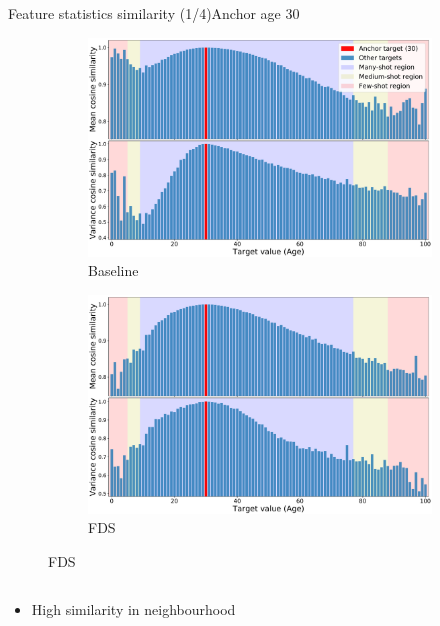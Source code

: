 \begin{frame}{Feature statistics similarity (1/4)}{Anchor age 30}
	\begin{figure}[h]
		\begin{subfigure}{0.48\textwidth}
			\includegraphics[width=\linewidth]{images/feat_sim_fds_base_30.pdf}
			\caption{Baseline}
		\end{subfigure}\hspace{1em}%
		\begin{subfigure}{0.48\textwidth}
			\includegraphics[width=\linewidth]{images/feat_sim_fds_ours_30.pdf}
			\caption{FDS}
		\end{subfigure}
	\end{figure}
	\vspace{-1em}
	\begin{columns}
		\footnotesize
		\begin{column}{0.5\textwidth}
			\begin{itemize}
				\item High similarity in neighbourhood

\end{itemize}
\end{column}
\end{columns}
\end{frame}
